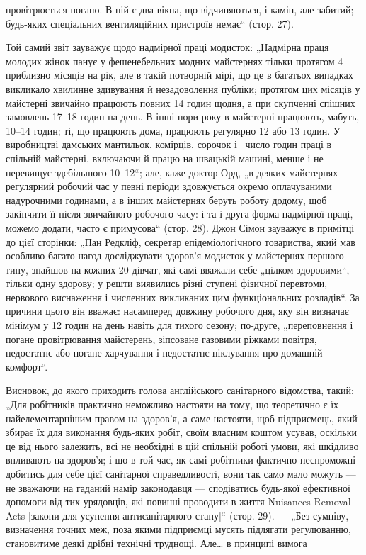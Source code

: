\parcont{}  %
провітрюється погано. В ній є два вікна, що відчиняються, і камін,
але забитий; будь-яких спеціальних вентиляційних пристроїв немає“ (стор. 27).

Той самий звіт зауважує щодо надмірної праці модисток:
„Надмірна праця молодих жінок панує у фешенебельних модних майстернях тільки протягом 4 приблизно
місяців на рік,
але в такій потворній мірі, що це в багатьох випадках викликало хвилинне здивування й незадоволення
публіки; протягом
цих місяців у майстерні звичайно працюють повних 14 годин
щодня, а при скупченні спішних замовлень 17--18 годин на день.
В інші пори року в майстерні працюють, мабуть, 10--14 годин;
ті, що працюють дома, працюють регулярно 12 або 13 годин.
У виробництві дамських мантильок, комірців, сорочок і~
число годин праці в спільній майстерні, включаючи й працю на
швацькій машині, менше і не перевищує здебільшого 10--12“;
але, каже доктор Орд, „в деяких майстернях регулярний робочий час у певні періоди здовжується окремо
оплачуваними надурочними годинами, а в інших майстернях беруть роботу додому, щоб закінчити її після
звичайного робочого часу: і та
і друга форма надмірної праці, можемо додати, часто є примусова“ (стор. 28). Джон Сімон зауважує в
примітці до цієї сторінки: „Пан Редкліф, секретар епідеміологічного товариства,
який мав особливо багато нагод досліджувати здоров’я модисток
у майстернях першого типу, знайшов на кожних 20 дівчат, які
самі вважали себе „цілком здоровими“, тільки одну здорову;
у решти виявились різні ступені фізичної перевтоми, нервового
виснаження і численних викликаних цим функціональних розладів“.
За причини цього він вважає: насамперед довжину робочого
дня, яку він визначає мінімум у 12 годин на день навіть для
тихого сезону; по-друге, „переповнення і погане провітрювання
майстерень, зіпсоване газовими ріжками повітря, недостатнє
або погане харчування і недостатнє піклування про домашній
комфорт“.

Висновок, до якого приходить голова англійського санітарного відомства, такий: „Для робітників
практично неможливо
настояти на тому, що теоретично є їх найелементарнішим правом
на здоров’я, а саме настояти, щоб підприємець, який збирає
їх для виконання будь-яких робіт, своїм власним коштом усував,
оскільки це від нього залежить, всі не необхідні в цій спільній
роботі умови, які шкідливо впливають на здоров’я; і що в той
час, як самі робітники фактично неспроможні добитись для себе
цієї санітарної справедливості, вони так само мало можуть —
не зважаючи на гаданий намір законодавця — сподіватись будь-якої ефективної допомоги від тих
урядовців, які повинні проводити в життя Nuisances Removal Acts [закони для усунення антисанітарного
стану]“ (стор. 29). — „Без сумніву, визначення точних меж, поза якими підприємці мусять підлягати
регулюванню, становитиме деякі дрібні технічні труднощі. Але\dots{} в принципі вимога
\parbreak{}  %
